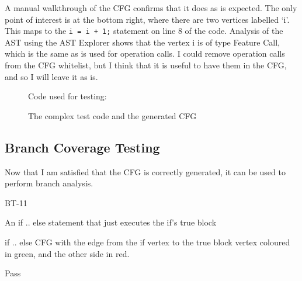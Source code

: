 A manual walkthrough of the CFG confirms that it does as is expected. The only point of interest is at the bottom right, where there are two vertices labelled `i'. This maps to the \verb|i = i + 1;| statement on line 8 of the code. Analysis of the AST using the AST Explorer shows that the vertex i is of type Feature Call, which is the same as is used for operation calls. I could remove operation calls from the CFG whitelist, but I think that it is useful to have them in the CFG, and so I will leave it as is.

\begin{figure}
\begin{minipage}{.6\textwidth}
\centering
\end{minipage}
\begin{minipage}{.39\textwidth}
  \centering
  Code used for testing:
  
\end{minipage}
\caption{The complex test code and the generated CFG}
\label{fig:testComplex}
\end{figure}


\subsection{Branch Coverage Testing}

Now that I am satisfied that the CFG is correctly generated, it can be used to perform branch analysis.

\begin{minipage}{0.6\textwidth}
\begin{description}[style=sameline,leftmargin=3.5cm,nolistsep]
\item[\hspace*{0.3cm}Label] BT-11
\item[\hspace*{0.3cm}Description] An if .. else statement that just executes the if's true block
\item[\hspace*{0.3cm}Expected Output] if .. else CFG with the edge from the if vertex to the true block vertex coloured in green, and the other side in red.
\item[\hspace*{0.3cm}Result] Pass
\end{description}
\end{minipage}
\begin{minipage}{0.39\textwidth}
\centering
{}
\end{minipage}

